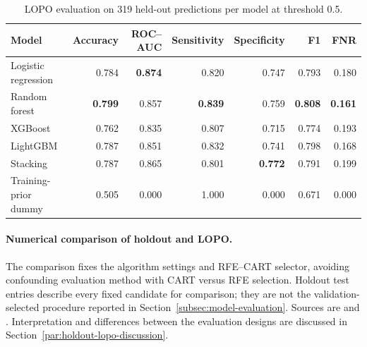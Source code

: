 \begin{table}[H]
\centering
\small
\caption{LOPO evaluation on 319 held-out predictions per model at threshold 0.5.}
\label{tab:building-lopo-results}
\begin{tabular}{@{}lrrrrrr@{}}
\toprule
Model & Accuracy & ROC--AUC & Sensitivity & Specificity & F1 & FNR \\
\midrule
Logistic regression & 0.784 & \textbf{0.874} & 0.820 & 0.747 & 0.793 & 0.180 \\
Random forest & \textbf{0.799} & 0.857 & \textbf{0.839} & 0.759 & \textbf{0.808} & \textbf{0.161} \\
XGBoost & 0.762 & 0.835 & 0.807 & 0.715 & 0.774 & 0.193 \\
LightGBM & 0.787 & 0.851 & 0.832 & 0.741 & 0.798 & 0.168 \\
Stacking & 0.787 & 0.865 & 0.801 & \textbf{0.772} & 0.791 & 0.199 \\
\midrule
Training-prior dummy & 0.505 & 0.000 & 1.000 & 0.000 & 0.671 & 0.000 \\
\bottomrule
\end{tabular}
\end{table}


\paragraph{Numerical comparison of holdout and LOPO.}
The comparison fixes the algorithm settings and RFE--CART selector, avoiding
confounding evaluation method with CART versus RFE selection. Holdout test
entries describe every fixed candidate for comparison; they are not the
validation-selected procedure reported in Section~\ref{subsec:model-evaluation}.
Sources are  and
. Interpretation and differences between the
evaluation designs are discussed in Section~\ref{par:holdout-lopo-discussion}.


